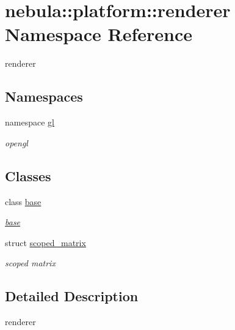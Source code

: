 \hypertarget{namespacenebula_1_1platform_1_1renderer}{
\section{nebula::platform::renderer Namespace Reference}
\label{namespacenebula_1_1platform_1_1renderer}
}


renderer  
\subsection*{Namespaces}
\begin{DoxyCompactItemize}
\item 
namespace \hyperlink{namespacenebula_1_1platform_1_1renderer_1_1gl}{gl}


\begin{DoxyCompactList}\small\item\em opengl \item\end{DoxyCompactList}\end{DoxyCompactItemize}
\subsection*{Classes}
\begin{DoxyCompactItemize}
\item 
class \hyperlink{classnebula_1_1platform_1_1renderer_1_1base}{base}
\begin{DoxyCompactList}\small\item\em \hyperlink{classnebula_1_1platform_1_1renderer_1_1base}{base} \item\end{DoxyCompactList}\item 
struct \hyperlink{structnebula_1_1platform_1_1renderer_1_1scoped__matrix}{scoped\_\-matrix}
\begin{DoxyCompactList}\small\item\em scoped matrix \item\end{DoxyCompactList}\end{DoxyCompactItemize}


\subsection{Detailed Description}
renderer 